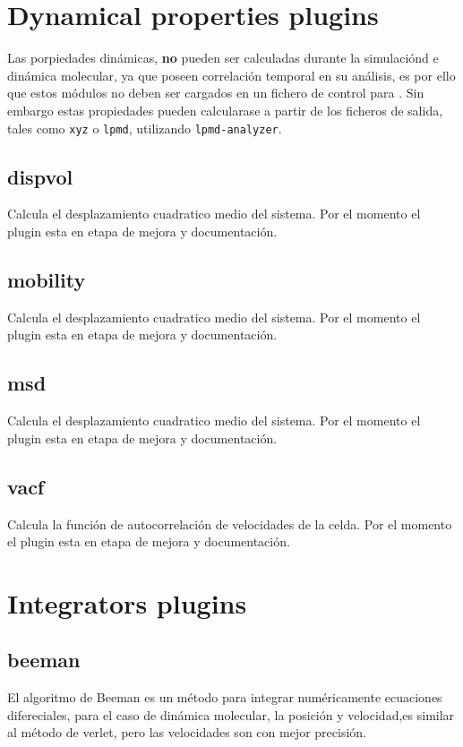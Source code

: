 \section{Dynamical properties plugins}
Las porpiedades din\'amicas, \textbf{no} pueden ser calculadas durante la
simulaci\'ond e din\'amica molecular, ya que poseen correlaci\'on temporal en su
an\'alisis, es por ello que estos m\'odulos no deben ser cargados en un fichero
de control para {\lpmd}. Sin embargo estas propiedades pueden calcularase a
partir de los ficheros de salida, tales como \verb|xyz| o \verb|lpmd|,
utilizando \verb|lpmd-analyzer|.
\subsection{dispvol}
Calcula el desplazamiento cuadratico medio del sistema. Por el momento el plugin
esta en etapa de mejora y documentaci\'on.
\subsection{mobility}
Calcula el desplazamiento cuadratico medio del sistema. Por el momento el plugin
esta en etapa de mejora y documentaci\'on.
\subsection{msd}
Calcula el desplazamiento cuadratico medio del sistema. Por el momento el plugin
esta en etapa de mejora y documentaci\'on.
\subsection{vacf}
Calcula la funci\'on de autocorrelaci\'on de velocidades de la celda. Por el
momento el plugin esta en etapa de mejora y documentaci\'on.


\section{Integrators plugins}
\subsection{beeman}
El algoritmo de Beeman es un m\'etodo para integrar num\'ericamente ecuaciones
difereciales, para el caso de din\'amica molecular, la posici\'on y velocidad,es
similar al m\'etodo de verlet, pero las velocidades son con mejor precisi\'on.

